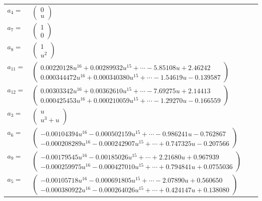 \documentclass[1p]{elsarticle_modified}
\theoremstyle{definition}
\begin{document}
\begin{tabular}{m{7pt} m{180pt} m{7pt} m{180pt} }
\flushright $a_{4}=$&$\begin{pmatrix}0\\u\end{pmatrix}$ \\
\flushright $a_{7}=$&$\begin{pmatrix}1\\0\end{pmatrix}$ \\
\flushright $a_{8}=$&$\begin{pmatrix}1\\u^2\end{pmatrix}$ \\
\flushright $a_{11}=$&$\begin{pmatrix}0.00220128 u^{16}+0.00289932 u^{15}+\cdots-5.85108 u+2.46242\\0.000344472 u^{16}+0.000340380 u^{15}+\cdots-1.54619 u-0.139587\end{pmatrix}$ \\
\flushright $a_{12}=$&$\begin{pmatrix}0.00303342 u^{16}+0.00362610 u^{15}+\cdots-7.69275 u+2.14413\\0.000425453 u^{16}+0.000210059 u^{15}+\cdots-1.29270 u-0.166559\end{pmatrix}$ \\
\flushright $a_{3}=$&$\begin{pmatrix}u\\u^3+u\end{pmatrix}$ \\
\flushright $a_{6}=$&$\begin{pmatrix}-0.00104394 u^{16}-0.000502159 u^{15}+\cdots-0.986241 u-0.762867\\-0.000208289 u^{16}-0.000242907 u^{15}+\cdots+0.747325 u-0.207566\end{pmatrix}$ \\
\flushright $a_{9}=$&$\begin{pmatrix}-0.00179545 u^{16}-0.00185026 u^{15}+\cdots+2.21680 u+0.967939\\-0.000259975 u^{16}-0.000427010 u^{15}+\cdots+0.794841 u+0.0755036\end{pmatrix}$ \\
\flushright $a_{5}=$&$\begin{pmatrix}-0.00105718 u^{16}-0.000691805 u^{15}+\cdots-2.07890 u+0.560650\\-0.000380922 u^{16}-0.000264026 u^{15}+\cdots+0.424147 u+0.138080\end{pmatrix}$ \\

\end{tabular}
\end{document}
